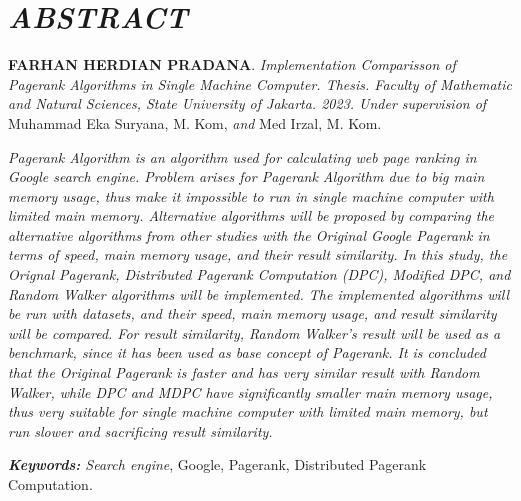 \chapter*{\textit{ABSTRACT}}

\textbf{FARHAN HERDIAN PRADANA}. \textit{Implementation Comparisson of Pagerank Algorithms in Single Machine Computer. Thesis. Faculty of Mathematic and Natural Sciences, State University of Jakarta. 2023. Under supervision of} Muhammad Eka Suryana, M. Kom, \textit{and} Med Irzal, M. Kom.

\textit{Pagerank Algorithm is an algorithm used for calculating web page ranking in Google search engine. Problem arises for Pagerank Algorithm due to big main memory usage, thus make it impossible to run in single machine computer with limited main memory. Alternative algorithms will be proposed by comparing the alternative algorithms from other studies with the Original Google Pagerank in terms of speed, main memory usage, and their result similarity. In this study, the Orignal Pagerank, Distributed Pagerank Computation (DPC), Modified DPC, and Random Walker algorithms will be implemented. The implemented algorithms will be run with datasets, and their speed, main memory usage, and result similarity will be compared. For result similarity, Random Walker's result will be used as a benchmark, since it has been used as base concept of Pagerank. It is concluded that the Original Pagerank is faster and has very similar result with Random Walker, while DPC and MDPC have significantly smaller main memory usage, thus very suitable for single machine computer with limited main memory, but run slower and sacrificing result similarity.}

\noindent
\textit{\textbf{Keywords:} Search engine}, Google, Pagerank, Distributed Pagerank Computation.